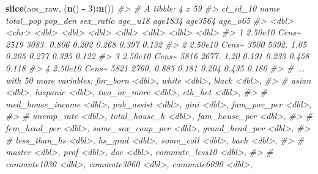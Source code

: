 \documentclass[
]{book}
\newenvironment{Shaded}{\begin{snugshade}}{\end{snugshade}}
\newcommand{\CommentTok}[1]{\textcolor[rgb]{0.56,0.35,0.01}{\textit{#1}}}
\newcommand{\DecValTok}[1]{\textcolor[rgb]{0.00,0.00,0.81}{#1}}
\newcommand{\KeywordTok}[1]{\textcolor[rgb]{0.13,0.29,0.53}{\textbf{#1}}}
\newcommand{\NormalTok}[1]{#1}
\newcommand{\OperatorTok}[1]{\textcolor[rgb]{0.81,0.36,0.00}{\textbf{#1}}}
\newcommand{\StringTok}[1]{\textcolor[rgb]{0.31,0.60,0.02}{#1}}
\begin{document}
\begin{Shaded}
\begin{Highlighting}[]
\KeywordTok{slice}\NormalTok{(acs\_raw, (}\KeywordTok{n}\NormalTok{() }\OperatorTok{{-}}\StringTok{ }\DecValTok{3}\NormalTok{)}\OperatorTok{:}\KeywordTok{n}\NormalTok{())}
\CommentTok{\#\textgreater{} \# A tibble: 4 x 59}
\CommentTok{\#\textgreater{}   ct\_id\_10 name  total\_pop pop\_den sex\_ratio age\_u18 age1834 age3564 age\_o65}
\CommentTok{\#\textgreater{}      \textless{}dbl\textgreater{} \textless{}chr\textgreater{}     \textless{}dbl\textgreater{}   \textless{}dbl\textgreater{}     \textless{}dbl\textgreater{}   \textless{}dbl\textgreater{}   \textless{}dbl\textgreater{}   \textless{}dbl\textgreater{}   \textless{}dbl\textgreater{}}
\CommentTok{\#\textgreater{} 1  2.50e10 Cens\textasciitilde{}      2519   3083.     0.806   0.202   0.268   0.397   0.132}
\CommentTok{\#\textgreater{} 2  2.50e10 Cens\textasciitilde{}      3500   5392.     1.05    0.205   0.277   0.395   0.122}
\CommentTok{\#\textgreater{} 3  2.50e10 Cens\textasciitilde{}      5816   2677.     1.20    0.191   0.233   0.458   0.118}
\CommentTok{\#\textgreater{} 4  2.50e10 Cens\textasciitilde{}      5821   2760.     0.885   0.181   0.204   0.435   0.180}
\CommentTok{\#\textgreater{} \# ... with 50 more variables: for\_born \textless{}dbl\textgreater{}, white \textless{}dbl\textgreater{}, black \textless{}dbl\textgreater{},}
\CommentTok{\#\textgreater{} \#   asian \textless{}dbl\textgreater{}, hispanic \textless{}dbl\textgreater{}, two\_or\_more \textless{}dbl\textgreater{}, eth\_het \textless{}dbl\textgreater{},}
\CommentTok{\#\textgreater{} \#   med\_house\_income \textless{}dbl\textgreater{}, pub\_assist \textless{}dbl\textgreater{}, gini \textless{}dbl\textgreater{}, fam\_pov\_per \textless{}dbl\textgreater{},}
\CommentTok{\#\textgreater{} \#   unemp\_rate \textless{}dbl\textgreater{}, total\_house\_h \textless{}dbl\textgreater{}, fam\_house\_per \textless{}dbl\textgreater{},}
\CommentTok{\#\textgreater{} \#   fem\_head\_per \textless{}dbl\textgreater{}, same\_sex\_coup\_per \textless{}dbl\textgreater{}, grand\_head\_per \textless{}dbl\textgreater{},}
\CommentTok{\#\textgreater{} \#   less\_than\_hs \textless{}dbl\textgreater{}, hs\_grad \textless{}dbl\textgreater{}, some\_coll \textless{}dbl\textgreater{}, bach \textless{}dbl\textgreater{},}
\CommentTok{\#\textgreater{} \#   master \textless{}dbl\textgreater{}, prof \textless{}dbl\textgreater{}, doc \textless{}dbl\textgreater{}, commute\_less10 \textless{}dbl\textgreater{},}
\CommentTok{\#\textgreater{} \#   commute1030 \textless{}dbl\textgreater{}, commute3060 \textless{}dbl\textgreater{}, commute6090 \textless{}dbl\textgreater{},}

\end{Highlighting}
\end{Shaded}
\end{document}
